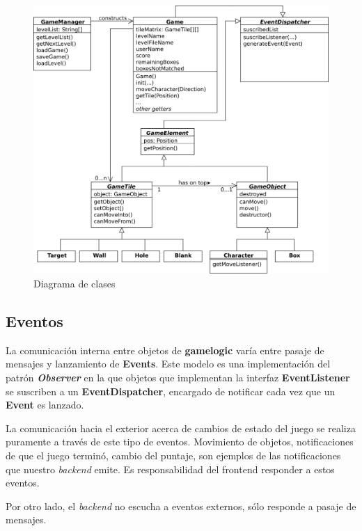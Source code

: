 \documentclass[a4paper,12pt,titlepage]{article}
\begin{document}
\begin{center}
	\begin{figure}[h]
		\center \includegraphics{ClassDiagram.png}
		\caption{Diagrama de clases}
	\end{figure}
\end{center}

\subsection{Eventos}

La comunicación interna entre objetos de \textbf{gamelogic} varía entre pasaje de mensajes y lanzamiento de \textbf{Events}. Este modelo es una implementación del patrón \textbf{\emph{Observer}} en la que objetos que implementan la interfaz \textbf{EventListener} se suscriben a un \textbf{EventDispatcher}, encargado de notificar cada vez que un \textbf{Event} es lanzado.

La comunicación hacia el exterior acerca de cambios de estado del juego se realiza puramente a través de este tipo de eventos. Movimiento de objetos, notificaciones de que el juego terminó, cambio del puntaje, son ejemplos de las notificaciones que nuestro \emph{backend} emite. Es responsabilidad del frontend responder a estos eventos.

Por otro lado, el \emph{backend} no escucha a eventos externos, sólo responde a pasaje de mensajes.
\end{document}
